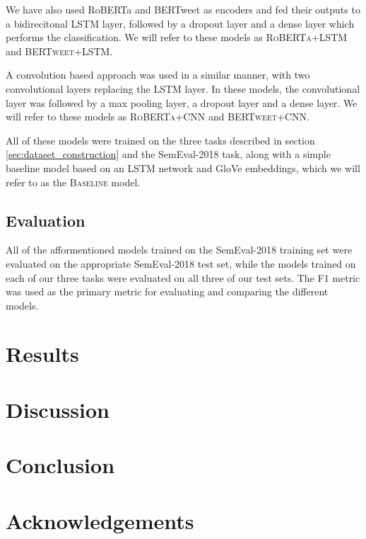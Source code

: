 \documentclass[10pt, a4paper]{article}
\begin{document}
We have also used RoBERTa and BERTweet as encoders and fed their outputs to a bidirecitonal LSTM layer, followed by 
a dropout layer and a dense layer which performs the classification. We will refer to these models as \textsc{RoBERTa+LSTM}
and \textsc{BERTweet+LSTM}. 

A convolution based approach was used in a similar manner, with two convolutional layers
replacing the LSTM layer. In these models, the convolutional layer was followed by a max pooling layer, a dropout layer
and a dense layer. We will refer to these models as \textsc{RoBERTa+CNN} and \textsc{BERTweet+CNN}.

All of these models were trained on the three tasks described in section \ref{sec:dataset_construction} and the SemEval-2018
task, along with a simple baseline model based on an LSTM network and GloVe embeddings, which we will refer to as the
\textsc{Baseline} model. 

\subsection{Evaluation}
All of the afformentioned models trained on the SemEval-2018 training set were evaluated on the appropriate 
SemEval-2018 test set, while the models trained on each of our three tasks were evaluated on all three of our test sets. 
The F1 metric was used as the primary metric for evaluating and comparing the different models.

\section{Results}

\section{Discussion}

\section{Conclusion}

\section*{Acknowledgements}


 
\end{document}
